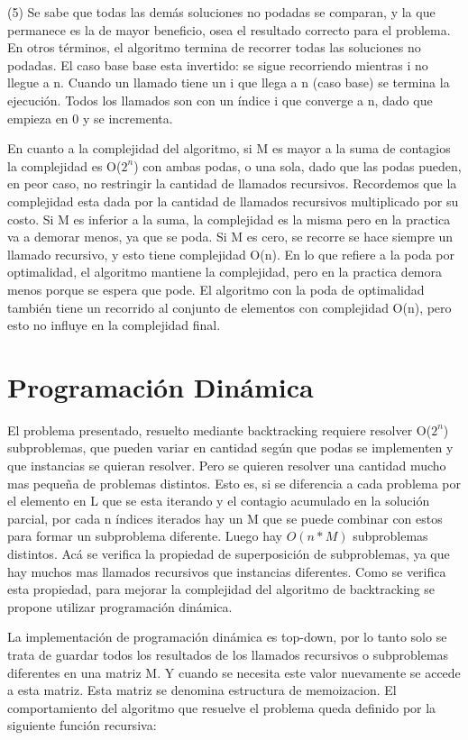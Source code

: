 \documentclass[10pt,a4paper]{article}
\begin{document}
(5) Se sabe que todas las demás soluciones no podadas se comparan, y la que permanece es la de mayor beneficio, osea el resultado correcto para el problema. En otros términos, el algoritmo termina de recorrer todas las soluciones no podadas. El caso base base esta invertido: se sigue recorriendo mientras i no llegue a n. Cuando un llamado tiene un i que llega a n (caso base) se termina la ejecución. Todos los llamados son con un índice i que converge a n, dado que empieza en 0 y se incrementa.

En cuanto a la complejidad del algoritmo, si M es mayor a la suma de contagios la complejidad es O($2^n$) con ambas podas, o una sola, dado que las podas pueden, en peor caso, no restringir la cantidad de llamados recursivos. Recordemos que la complejidad esta dada por la cantidad de llamados recursivos multiplicado por su costo. Si M es inferior a la suma, la complejidad es la misma pero en la practica va a demorar menos, ya que se poda. Si M es cero, se recorre se hace siempre un llamado recursivo, y esto tiene complejidad O(n). En lo que refiere a la poda por optimalidad, el algoritmo mantiene la complejidad, pero en la practica demora menos porque se espera que pode. El algoritmo con la poda de optimalidad también tiene un recorrido al conjunto de elementos con complejidad O(n), pero esto no influye en la complejidad final.

\section{Programación Dinámica} \label{sec:dp}
El problema presentado, resuelto mediante backtracking requiere resolver O($2^n$) subproblemas, que pueden variar en cantidad según que podas se implementen y que instancias se quieran resolver. Pero se quieren resolver una cantidad mucho mas pequeña de problemas distintos. Esto es, si se diferencia a cada problema por el elemento en L que se esta iterando y el contagio acumulado en la solución parcial, por cada n índices iterados hay un M que se puede combinar con estos para formar un subproblema diferente. Luego hay $O(n*M)$ subproblemas distintos. Acá se verifica la propiedad de superposición de subproblemas, ya que hay muchos mas llamados recursivos que instancias diferentes. Como se verifica esta propiedad, para mejorar la complejidad del algoritmo de backtracking se propone utilizar programación dinámica.

La implementación de programación dinámica es top-down, por lo tanto solo se trata de guardar todos los resultados de los llamados recursivos o subproblemas diferentes en una matriz M. Y cuando se necesita este valor nuevamente se accede a esta matriz. Esta matriz se denomina estructura de memoizacion. El comportamiento del algoritmo que resuelve el problema queda definido por la siguiente función recursiva:
\end{document}
